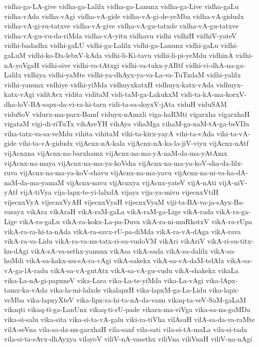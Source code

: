 {vidha-ga-LA-give
vidha-ga-Lalilx
vidha-ga-Lanunx
vidha-ga-Live
vidha-gaLu
vidha-vAda
vidha-vAgi
vidha-vA-gide
vidha-vA-gi-de-yeMba
vidha-vA-gidudx
vidha-vA-gi-ru-tatxve
vidha-vA-give
vidha-vA-gu-tatxde
vidha-vA-gu-tatxve
vidha-vA-gu-vu-da-riMda
vidha-vA-yitu
vidhavu
vidhi
vidhiH
vidhiV-yateV
vidhi-badadhx
vidhi-gaLU
vidhi-ga-Lalilx
vidhi-ga-Lanunx
vidhi-gaLu
vidhi-gaLuM
vidhi-ko-Da-lebxV-kAda
vidhi-li-Ki-tavu
vidhi-li-pi-yeMdu
vidhinA
vidhi-nA-yoVgaH
vidhi-sive
vidhi-va-tAtxgi
vidhi-va-tukx-yARtf
vidhi-vi-dhA-na-ga-Lalilx
vidhiya
vidhi-yaMte
vidhi-ya-dhAyx-ya-va-La-va-TuTxdaM
vidhi-yalilx
vidhi-yanunx
vidhiye
vidhi-yiMda
vidhuyxkatxH
vidhuyx-katx-vAda
vidhuyx-katx-vAgi
viditAvx
vidita
viditaM
vidi-taM-ga-LakukxM
vidi-ta-kA-ma-korxV-dha-loV-BA-sapx-da-vi-ra-hi-taru
vidi-ta-sa-doyxV-jAta
viduH
viduSAM
viduSoV
vidurx-ma-parx-Bamf
viduyx-nAmxli
viga-haRMti
vigarxha
vigarxhaH
vigataM
vigi-di-riTuTx
vihAreYH
vihAya
vihaMga
vihaM-ga-naM-tA-ga-beVDa
viha-tatx-va-sa-veMdu
vihita
vihitaM
vihi-ta-kirx-yayA
vihi-ta-vAda
vihi-ta-vA-gide
vihi-ta-vA-gidudx
vijAcnx-nA-kala
vijAcnx-nA-ka-la-jiV-viyu
vijAcnx-nAtf
vijAcnxna
vijAcnx-na-barxhamx
vijAcnx-na-ma-yA-naM-da-ma-yAtAmx
vijAcnx-na-maya
vijAcnx-na-ma-ya-koVsha
vijAcnx-na-ma-ya-koV-sha-da-lilx-ruva
vijAcnx-na-ma-ya-koV-shavu
vijAcnx-na-ma-yavu
vijAcnx-na-ni-va-ha-dA-naM-da-ma-yamaM
vijAcnx-navu
vijAcnxya
vijAcnx-yateV
vijA-nAti
vijA-niV-yAtf
vijA-tiVya
vija-lapx-te-yi-lalxdA
vijaya
vija-ya-mivu
vijecnxVtiH
vijecnxVyA
vijecnxVyAH
vijecnxVyaH
vijecnxVyaM
viji-ta-BA-va-ja-sAyx-Ba-vasayx
vikAra
vikAraH
vikA-raM-gaLa
vikA-raM-ga-Lige
vikA-rada
vikA-ra-ga-Lige
vikA-ra-gaLu
vikA-ra-kokx-La-pa-Duva
vikA-ra-ni-muRkotxV
vikA-ra-rUpa
vikA-ra-ra-hi-ta-nAda
vikA-ra-savx-rU-pa-diMda
vikA-ra-vA-dAga
vikA-rava
vikA-ra-va-Lidu
vikA-ra-va-nu-tatx-ri-su-vudoVM
vikAri
vikAriV
vikA-ri-su-titx-hu-dAgi
vikA-sA-va-sethx-yanunx
vikAsa
vikA-sada
vikA-sa-dalilx
vikA-sa-hoMdi
vikA-sa-kakx-nu-sA-ra-vAgi
vikA-sakekx
vikA-sa-vA-daM-telAlx
vikA-sa-vA-ga-lA-radu
vikA-sa-vA-gutAtx
vikA-sa-vA-gu-vudu
vikA-shakekx
vikaLa
vika-La-nA-gi-papxneV
vika-Lara
vika-La-te-yiMda
vika-La-vAgi
vika-lApx-tamx-ka-vAda
vika-la-mi-lalxde
vikalapxH
vika-lapxM-ga-La-Lidu
vika-lapx-veMba
vika-lapxyXteV
vika-lipx-ra-hi-ta-nA-da-vanu
vikaq-ta-veV-SaM-gaLaM
vikaqti
vikaq-ti-ga-LanUnx
vikaq-ti-rU-pade
vikarx-ma-viVga
vika-sa-na-goMDa
vika-si-salu
vika-sita
vika-si-ta-vA-galu
viki-ra-tiVha
vilAsaH
vilA-sa-da-va-raMte
vilA-seVna
vila-sa-da-nu-garxhaH
vila-sanf
vila-sati
vila-si-tA-maLa
vila-si-tada
vila-si-ta-sAvx-dhAyxya
vilayoV
viliV-nA-vasethx
viliVna
viliVnaH
viliV-na-nAgi
}
